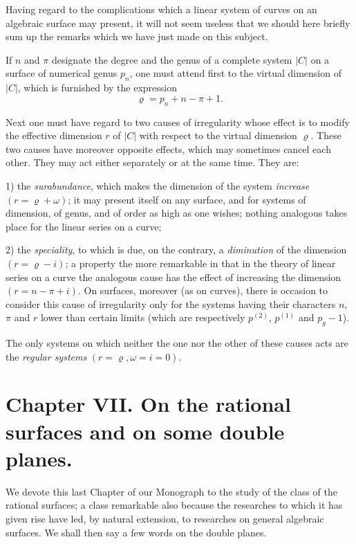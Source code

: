 \documentclass{article}
\begin{document}
Having regard to the complications which a linear system of curves on an algebraic surface may present, it will not seem useless that we should here briefly sum up the remarks which we have just made on this subject.

If $n$ and $\pi$ designate the degree and the genus of a complete system $|C|$ on a surface of numerical genus $p_{n}$, one must attend first to the virtual dimension of $|C|$, which is furnished by the expression
\[ \varrho = p_{n} + n - \pi + 1. \]

Next one must have regard to two causes of irregularity whose effect is to modify the effective dimension $r$ of $|C|$ with respect to the virtual dimension $\varrho$. These two causes have moreover opposite effects, which may sometimes cancel each other. They may act either separately or at the same time. They are:

1) the \emph{surabundance}, which makes the dimension of the system \emph{increase} $(r = \varrho + \omega)$; it may present itself on any surface, and for systems of dimension, of genus, and of order as high as one wishes; nothing analogous takes place for the linear series on a curve;

2) the \emph{speciality}, to which is due, on the contrary, a \emph{diminution} of the dimension $(r = \varrho - i)$; a property the more remarkable in that in the theory of linear series on a curve the analogous cause has the effect of increasing the dimension $(r = n - \pi + i)$. On surfaces, moreover (as on curves), there is occasion to consider this cause of irregularity only for the systems having their characters $n$, $\pi$ and $r$ lower than certain limits (which are respectively $p^{(2)}$, $p^{(1)}$ and $p_{g} - 1$).

The only systems on which neither the one nor the other of these causes acts are the \emph{regular systems} $(r = \varrho, \omega = i = 0)$.


\section*{Chapter VII. On the rational surfaces and on some double planes.}

We devote this last Chapter of our Monograph to the study of the class of the rational surfaces; a class remarkable also because the researches to which it has given rise have led, by natural extension, to researches on general algebraic surfaces. We shall then say a few words on the double planes.
\end{document}

